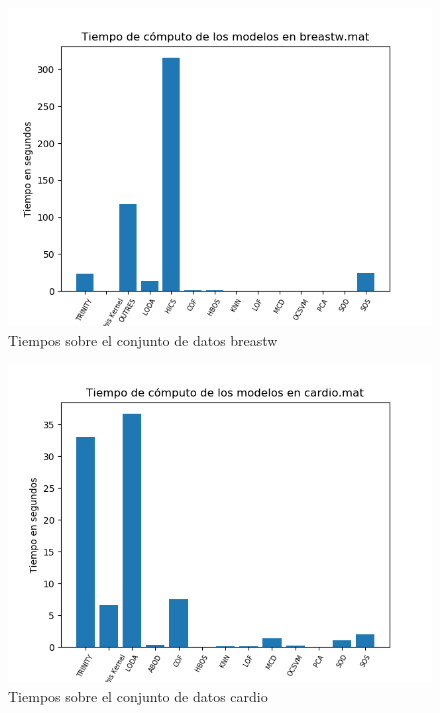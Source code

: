\begin{figure}[H]
	\centering
	\includegraphics[scale=0.7]{imagenes/imgs-exp1/times/breastw}
	\caption{Tiempos sobre el conjunto de datos breastw}
	\label{breastw_times}
\end{figure}

\begin{figure}[H]
	\centering
	\includegraphics[scale=0.7]{imagenes/imgs-exp1/times/cardio}
	\caption{Tiempos sobre el conjunto de datos cardio}
	\label{cardio_times}
\end{figure}


